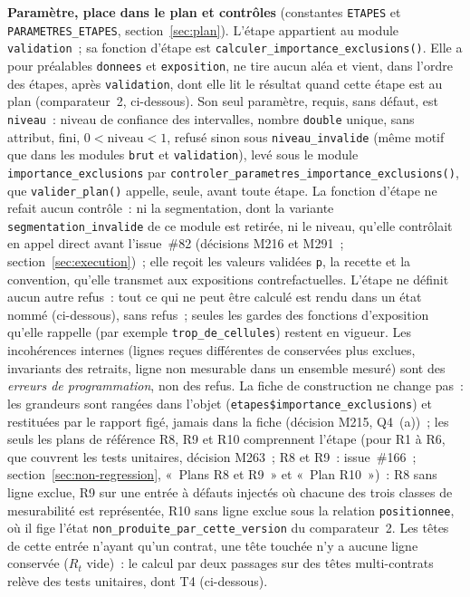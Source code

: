 \documentclass[a4paper,11pt]{article}
\newcommand{\code}[1]{\texttt{\small #1}}
\begin{document}
{\medskip
\textbf{Paramètre, place dans le plan et contrôles} (constantes
\code{ETAPES} et \code{PARAMETRES\_ETAPES}, section~\ref{sec:plan}). L'étape
appartient au module \code{validation}~; sa fonction d'étape est
\code{calculer\_importance\_exclusions()}. Elle a pour préalables
\code{donnees} et \code{exposition}, ne tire aucun aléa et vient, dans
l'ordre des étapes, après \code{validation}, dont elle lit le résultat
quand cette étape est au plan (comparateur~2, ci-dessous). Son seul
paramètre, requis, sans défaut, est \code{niveau}~: niveau de confiance des
intervalles, nombre \code{double} unique, sans attribut, fini, $0 <
\text{niveau} < 1$, refusé sinon sous \code{niveau\_invalide} (même motif
que dans les modules \code{brut} et \code{validation}), levé sous le module
\code{importance\_exclusions} par
\code{controler\_parametres\_importance\_exclusions()}, que
\code{valider\_plan()} appelle, seule, avant toute étape. La fonction
d'étape ne refait aucun contrôle~: ni la segmentation, dont la variante
\code{segmentation\_invalide} de ce module est retirée, ni le niveau,
qu'elle contrôlait en appel direct avant l'issue~\#82 (décisions M216 et
M291~; section~\ref{sec:execution})~; elle reçoit les valeurs validées
\code{p}, la recette et la convention, qu'elle transmet aux expositions
contrefactuelles. L'étape ne
définit aucun autre refus~: tout ce qui ne peut être calculé est rendu dans
un état nommé (ci-dessous), sans refus~; seules les gardes des fonctions
d'exposition qu'elle rappelle (par exemple \code{trop\_de\_cellules})
restent en vigueur. Les incohérences internes (lignes reçues
différentes de conservées plus exclues, invariants des retraits, ligne non
mesurable dans un ensemble mesuré) sont des \emph{erreurs de programmation},
non des refus. La fiche de construction ne change pas~: les grandeurs sont
rangées dans l'objet (\code{etapes\$importance\_exclusions}) et restituées
par le rapport figé, jamais dans la fiche (décision M215, Q4~(a))~; les
seuls les plans de référence R8, R9 et R10 comprennent l'étape (pour R1
à R6, que couvrent les tests unitaires, décision M263~; R8 et R9~:
issue~\#166~; section~\ref{sec:non-regression}, «~Plans R8 et R9~» et
«~Plan R10~»)~: R8 sans ligne exclue, R9 sur une entrée à défauts injectés
où chacune des trois classes de mesurabilité est représentée, R10 sans
ligne exclue sous la relation \code{positionnee}, où il fige l'état
\code{non\_produite\_par\_cette\_version} du comparateur~2. Les têtes de cette entrée
n'ayant qu'un contrat, une tête touchée n'y a aucune ligne conservée
($R_t$ vide)~: le calcul par deux passages sur des têtes multi-contrats
relève des tests unitaires, dont T4 (ci-dessous).

}
\end{document}
